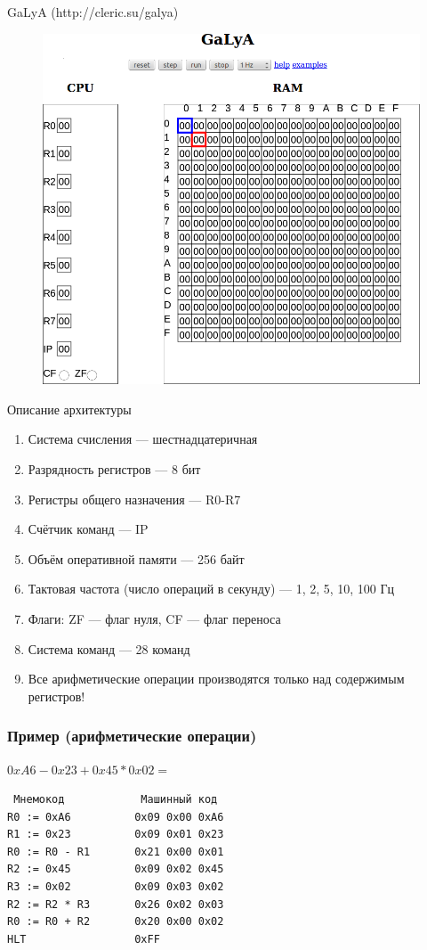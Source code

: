\documentclass{beamer}
\begin{document}
    \subsection{}
    \begin{frame}{GaLyA (http://cleric.su/galya)}
    \begin{figure}
        \includegraphics[width=0.7\linewidth]{fig/galya.png}
    \end{figure}
    \end{frame}
    \begin{frame}{Описание архитектуры}
        \begin{enumerate}
            \item Система счисления --- шестнадцатеричная
            \item Разрядность регистров --- 8 бит
            \item Регистры общего назначения --- R0-R7
            \item Счётчик команд --- IP
            \item Объём оперативной памяти --- 256 байт
            \item Тактовая частота (число операций в секунду) --- 1, 2, 5, 10, 100 Гц
            \item Флаги: ZF --- флаг нуля, CF --- флаг переноса
            \item Система команд --- 28 команд
            \item Все арифметические операции производятся только над содержимым регистров!
        \end{enumerate}
    \end{frame}
    \begin{frame}[fragile]
        \frametitle{Пример (арифметические операции)}
        \begin{block}{$0xA6 - 0x23 + 0x45*0x02 = $}
        \begin{verbatim}
 Мнемокод            Машинный код
R0 := 0xA6          0x09 0x00 0xA6
R1 := 0x23          0x09 0x01 0x23
R0 := R0 - R1       0x21 0x00 0x01
R2 := 0x45          0x09 0x02 0x45
R3 := 0x02          0x09 0x03 0x02
R2 := R2 * R3       0x26 0x02 0x03
R0 := R0 + R2       0x20 0x00 0x02
HLT                 0xFF
        \end{verbatim}
        \end{block}
\end{frame}
\end{document}
